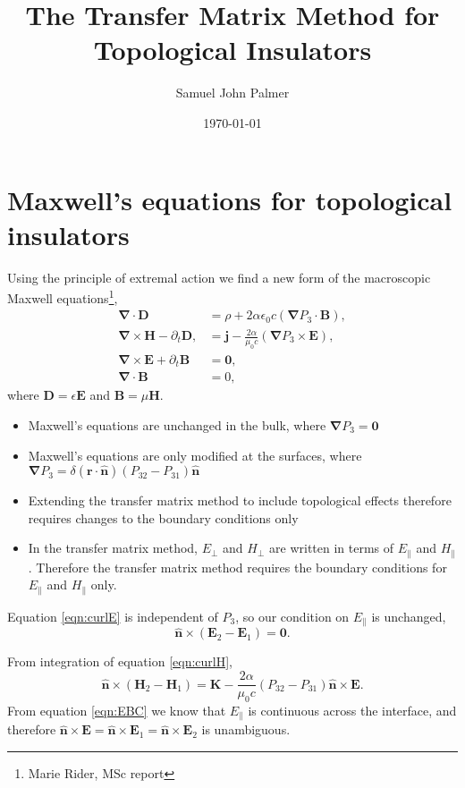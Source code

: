 \documentclass[notitlepage,nofootinbib]{revtex4-1}
\renewcommand{\vec}[1]{\mathbf{#1}}
\newcommand{\grad}{\boldsymbol{\nabla}}
\newcommand{\divg}{\boldsymbol{\nabla}\cdot}
\newcommand{\curl}{\boldsymbol{\nabla}\times}
\begin{document}
\title{The Transfer Matrix Method for Topological Insulators}
\author{Samuel John Palmer}
\date{\today}
\maketitle

\section{Maxwell's equations for topological insulators}
Using the principle of extremal action we find a new form of the macroscopic Maxwell equations\footnote{Marie Rider, MSc report},
\begin{subequations}\begin{alignat}{2}
	\label{eqn:divgD}
	\divg \vec{D}
	&=
	\rho + 2 \alpha \epsilon_0 c \left(\grad P_3 \cdot \vec{B}\right),
	\\
	\label{eqn:curlH}
	\curl \vec{H} - \partial_t \vec{D},
	&=
	\vec{j} - \frac{2\alpha}{\mu_0c}\left(\grad P_3 \times \vec{E} \right),
	\\
	\label{eqn:curlE}
	\curl \vec{E} + \partial_t \vec{B}
	&=
	\vec{0},
	\\
	\label{eqn:divgB}
	\divg \vec{B}
	&=
	0,
\end{alignat}\end{subequations}
where $ \vec{D} = \epsilon \vec{E} $ and $ \vec{B} = \mu \vec{H} $.

\begin{itemize}
	\item Maxwell's equations are unchanged in the bulk, where $ \grad P_3 = \vec{0} $
	\item Maxwell's equations are only modified at the surfaces, where $ \grad P_3 = \delta(\vec{r}\cdot\vec{\hat{n}}) (P_{32} - P_{31}) \vec{\hat{n}} $
	\item Extending the transfer matrix method to include topological effects therefore requires changes to the boundary conditions only
	\item In the transfer matrix method, $ E_\perp $ and $ H_\perp $ are written in terms of $ E_\parallel $ and $ H_\parallel $. Therefore the transfer matrix method requires the boundary conditions for $ E_\parallel $ and $ H_\parallel $ only.
\end{itemize}

Equation \eqref{eqn:curlE} is independent of $ P_3 $, so our condition on $ E_\parallel $ is unchanged,
\begin{equation}
	\label{eqn:EBC}
	\vec{\hat{n}} \times (\vec{E}_2 - \vec{E}_1) = \vec{0}.
\end{equation}

From integration of equation \eqref{eqn:curlH},
\begin{equation}
	\label{eqn:HBC}
	\vec{\hat{n}} \times (\vec{H}_2 - \vec{H}_1) = \vec{K} - \frac{2\alpha}{\mu_0c}(P_{32}-P_{31}) \vec{\hat{n}} \times \vec{E}.
\end{equation}
From equation \eqref{eqn:EBC} we know that $ E_\parallel $ is continuous across the interface, and therefore $ \vec{\hat{n}} \times \vec{E} = \vec{\hat{n}} \times \vec{E}_1 = \vec{\hat{n}} \times \vec{E}_2 $ is unambiguous.
\end{document}

